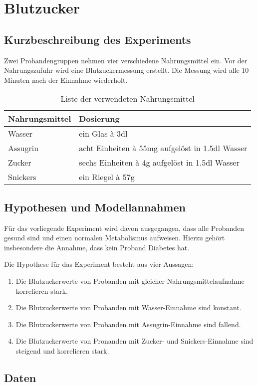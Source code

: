 \section{Blutzucker}

\subsection{Kurzbeschreibung des Experiments}
Zwei Probandengruppen nehmen vier verschiedene Nahrungsmittel ein.
Vor der Nahrungszufuhr wird eine Blutzuckermessung erstellt. Die Messung
wird alle 10 Minuten nach der Einnahme wiederholt. 
\begin{table}[h!]
	\centering
	\begin{tabular}{l l}
		Nahrungsmittel & Dosierung \\
		\hline
		Wasser & ein Glas à 3dl \\
		Assugrin & acht Einheiten à 55mg aufgelöst in 1.5dl Wasser \\
		Zucker & sechs Einheiten à 4g aufgelöst in 1.5dl Wasser \\
		Snickers & ein Riegel à 57g
	\end{tabular}
	\caption{Liste der verwendeten Nahrungsmittel}
\end{table}

\subsection{Hypothesen und Modellannahmen}
Für das vorliegende Experiment wird davon ausgegangen, dass alle Probanden
gesund sind und einen normalen Metabolismus aufweisen. Hierzu gehört
insbesondere die Annahme, dass kein Proband Diabetes hat.

Die Hypothese für das Experiment besteht aus vier Aussagen:
\begin{enumerate}[label=(\alph*)]
	\item Die Blutzuckerwerte von Probanden mit gleicher
		Nahrungsmittelaufnahme korrelieren stark.
	\item Die Blutzuckerwerte von Probanden mit Wasser-Einnahme sind
		konstant.
	\item Die Blutzuckerwerte von Probanden mit Assugrin-Einnahme
		sind fallend.
	\item Die Blutzuckerwerte von Pronanden mit Zucker- und
		Snickers-Einnahme sind steigend und korrelieren stark.
\end{enumerate}

\subsection{Daten}

